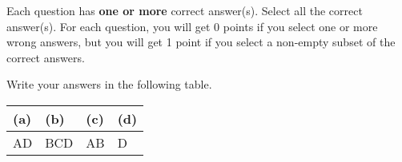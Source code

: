 
Each question has \textbf{one or more} correct answer(s). Select all the correct answer(s). For each question, you will get 0 points if you select one or more wrong answers, but you will get 1 point if you select a non-empty subset of the correct answers.

Write your answers in the following table.


\begin{table}[htbp]
    \centering
    \begin{tabular}{|p{2cm}|p{2cm}|p{2cm}|p{2cm}|}
        \hline
        (a) & (b) & (c) & (d) \\
        \hline
        AD  & BCD & AB  & D    \\
        \hline
    \end{tabular}
\end{table}

